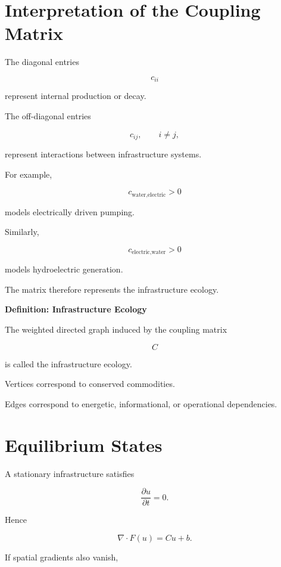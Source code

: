 \documentclass[11pt,fleqn]{book}
\numberwithin{equation}{chapter}
\newenvironment{definition}[1]
  {\begin{definitionEnv}
   \noindent\textbf{Definition: #1}\par\smallskip}
  {\end{definitionEnv}}
\theoremstyle{plain}
\theoremstyle{definition}
\theoremstyle{remark}
\begin{document}
\section{Interpretation of the Coupling Matrix}

The diagonal entries

\[
c_{ii}
\]

represent internal production or decay.

The off-diagonal entries

\[
c_{ij},
\qquad
i\neq j,
\]

represent interactions between infrastructure systems.

For example,

\[
c_{\text{water},\text{electric}}
>0
\]

models electrically driven pumping.

Similarly,

\[
c_{\text{electric},\text{water}}
>0
\]

models hydroelectric generation.

The matrix therefore represents the infrastructure ecology.


\begin{definition}{Infrastructure Ecology}

The weighted directed graph induced by the coupling matrix

\[
C
\]

is called the infrastructure ecology.

Vertices correspond to conserved commodities.

Edges correspond to energetic, informational, or operational
dependencies.

\end{definition}


\section{Equilibrium States}

A stationary infrastructure satisfies

\[
\frac{\partial u}{\partial t}
=
0.
\]

Hence

\[
\nabla\cdot F(u)
=
Cu+b.
\]

If spatial gradients also vanish,
\end{document}
